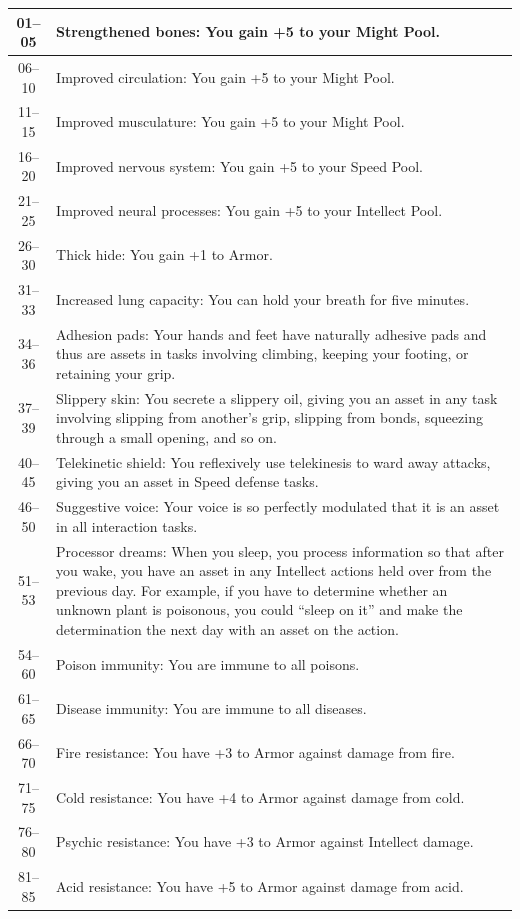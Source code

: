 \begin{longtable}{| c | p{15cm} |}
01–05 & Strengthened bones: You gain +5 to your Might Pool. \\ \hline
06–10 & Improved circulation: You gain +5 to your Might Pool. \\ \hline
11–15 & Improved musculature: You gain +5 to your Might Pool. \\ \hline
16–20 & Improved nervous system: You gain +5 to your Speed Pool. \\ \hline
21–25 & Improved neural processes: You gain +5 to your Intellect Pool. \\ \hline
26–30 & Thick hide: You gain +1 to Armor. \\ \hline
31–33 & Increased lung capacity: You can hold your breath for five minutes. \\ \hline
34–36 & Adhesion pads: Your hands and feet have naturally adhesive pads and thus are assets in tasks involving climbing, keeping your footing, or retaining your grip. \\ \hline
37–39 & Slippery skin: You secrete a slippery oil, giving you an asset in any task involving slipping from another’s grip, slipping from bonds, squeezing through a small opening, and so on. \\ \hline
40–45 & Telekinetic shield: You reflexively use telekinesis to ward away attacks, giving you an asset in Speed defense tasks. \\ \hline
46–50 & Suggestive voice: Your voice is so perfectly modulated that it is an asset in all interaction tasks. \\ \hline
51–53 & Processor dreams: When you sleep, you process information so that after you wake, you have an asset in any Intellect actions held over from the previous day. For example, if you have to determine whether an unknown plant is poisonous, you could “sleep on it” and make the determination the next day with an asset on the action. \\ \hline
54–60 & Poison immunity: You are immune to all poisons. \\ \hline
61–65 & Disease immunity: You are immune to all diseases. \\ \hline
66–70 & Fire resistance: You have +3 to Armor against damage from fire. \\ \hline
71–75 & Cold resistance: You have +4 to Armor against damage from cold. \\ \hline
76–80 & Psychic resistance: You have +3 to Armor against Intellect damage. \\ \hline
81–85 & Acid resistance: You have +5 to Armor against damage from acid. \\ \hline

\end{longtable}
